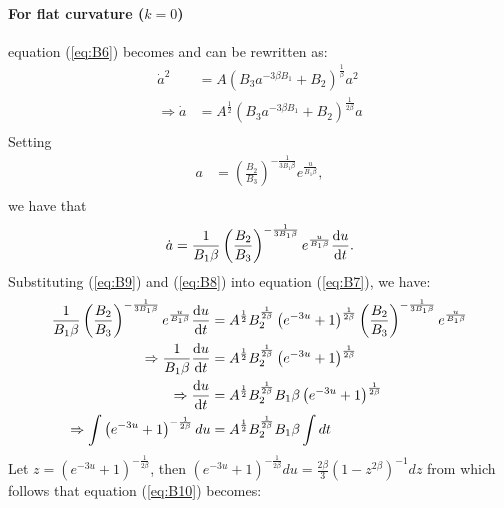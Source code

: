 \documentclass[a4paper, 11pt]{FSKH_623_Report}
\numberwithin{equation}{section}
\newcommand{\brac}[1]{\left(#1\right)}
\begin{document}
\paragraph{For flat curvature ($k=0$)}
equation (\ref{eq:B6}) becomes and can be rewritten as:
\begin{equation}\label{eq:B7}
\begin{split}
\dot{a}^{2} &= A\brac{B_{3}a^{-3\beta B_{1}}+B_{2}}^{\frac{1}{\beta}} a^{2}\\
\Rightarrow \dot{a} &= A^{\frac{1}{2}}\brac{B_{3}a^{-3\beta B_{1}}+B_{2}}^{\frac{1}{2\beta}} a\\
\end{split}
\end{equation}
Setting 
\begin{equation}\label{eq:B8}
\begin{split}
a&=\brac{\frac{B_{2}}{B_{3}}}^{-\frac{1}{3B_{1}\beta}}e^{\frac{u}{B_{1}\beta}},\\
\end{split}
\end{equation}
we have that 
\begin{equation}\label{eq:B9}
\begin{split}
\dot{a}&=\frac{1}{B_{1}\beta}\brac{\frac{B_{2}}{B_{3}}}^{-\frac{1}{3B_{1}\beta}}e^{\frac{u}{B_{1}\beta}}\dv{u}{t}.\\
\end{split}
\end{equation}
Substituting (\ref{eq:B9}) and (\ref{eq:B8}) into equation (\ref{eq:B7}), we have:
\begin{equation}\label{eq:B10}
\begin{split}
\frac{1}{B_{1}\beta}\brac{\frac{B_{2}}{B_{3}}}^{-\frac{1}{3B_{1}\beta}}e^{\frac{u}{B_{1}\beta}}\dv{u}{t} &= A^{\frac{1}{2}}B_{2}^{\frac{1}{2\beta}}\brac{e^{-3u}+1}^{\frac{1}{2\beta}} \brac{\frac{B_{2}}{B_{3}}}^{-\frac{1}{3B_{1}\beta}}e^{\frac{u}{B_{1}\beta}}\\
\Rightarrow \frac{1}{B_{1}\beta}\dv{u}{t} &= A^{\frac{1}{2}}B_{2}^{\frac{1}{2\beta}}\brac{e^{-3u}+1}^{\frac{1}{2\beta}} \\
\Rightarrow \dv{u}{t} &= A^{\frac{1}{2}}B_{2}^{\frac{1}{2\beta}}B_{1}\beta\brac{e^{-3u}+1}^{\frac{1}{2\beta}} \\
\Rightarrow\int \brac{e^{-3u}+1}^{-\frac{1}{2\beta}} du&= A^{\frac{1}{2}}B_{2}^{\frac{1}{2\beta}}B_{1}\beta \int dt \\
\end{split}
\end{equation}
Let $z=\brac{e^{-3u}+1}^{-\frac{1}{2\beta}}$, then $\brac{e^{-3u}+1}^{-\frac{1}{2\beta}}du=\frac{2\beta}{3}\brac{1-z^{2\beta}}^{-1}dz$ from which follows that equation (\ref{eq:B10}) becomes:
\end{document}
